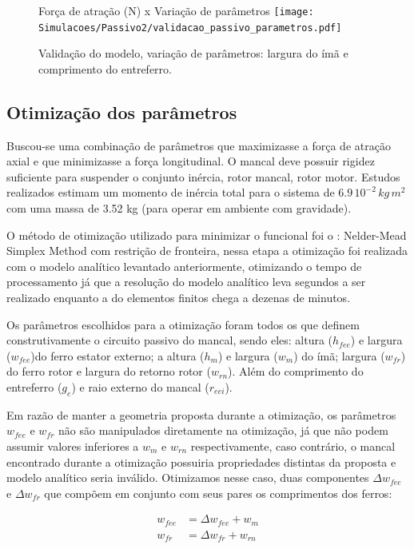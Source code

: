 \begin{figure}[th!]
	\centering
	Força de atração (N) x Variação de parâmetros
	\texttt{[image: Simulacoes/Passivo2/validacao\_passivo\_parametros.pdf]}
	\caption{Validação do modelo, variação de parâmetros: largura do ímã e comprimento do entreferro.}
	\label{fig:validacao_passivo_parametros}
\end{figure} 


\subsection{Otimização dos parâmetros}

Buscou-se uma combinação de parâmetros que maximizasse a força de atração axial e que minimizasse a força longitudinal. O mancal deve possuir rigidez suficiente para suspender o conjunto inércia, rotor mancal, rotor motor. Estudos realizados estimam um momento de inércia total para o sistema de $6.9 \, 10^{-2} \, kg \, m^2$ com uma massa de 3.52 kg (para operar em ambiente com gravidade). 

O método de otimização utilizado para minimizar o funcional foi o :  Nelder-Mead Simplex Method com restrição de fronteira,  nessa etapa a otimização foi realizada com o modelo analítico levantado anteriormente, otimizando o tempo de processamento já que a resolução do modelo analítico leva segundos a ser realizado enquanto a do elementos finitos chega a dezenas de minutos.

Os parâmetros escolhidos para a otimização foram todos os que definem construtivamente o circuito passivo do mancal, sendo eles: altura  ($h_{fee}$) e largura  ($w_{fee}$)do ferro estator externo; a altura ($h_m$) e largura ($w_m$) do ímã;  largura ($w_{fr}$) do ferro rotor e largura do retorno rotor ($w_{rn}$). Além do comprimento do entreferro ($g_e$) e raio externo do mancal ($r_{eei}$).

Em razão de manter a geometria proposta durante a otimização, os parâmetros $w_{fee}$ e $w_{fr}$ não são manipulados diretamente na otimização, já que não podem assumir valores inferiores a $w_m$ e $w_{rn}$ respectivamente, caso contrário, o mancal encontrado durante a otimização possuiria propriedades distintas da proposta e modelo analítico seria inválido. Otimizamos nesse caso, duas componentes $\Delta w_{fee}$ e $\Delta w_{fr}$ que compõem em conjunto com seus pares os comprimentos dos ferros:

\begin{align}
	w_{fee}  &= \Delta w_{fee} + w_m \\
	w_{fr} &= \Delta w_{fr} + w_{rn}
\end{align}	

